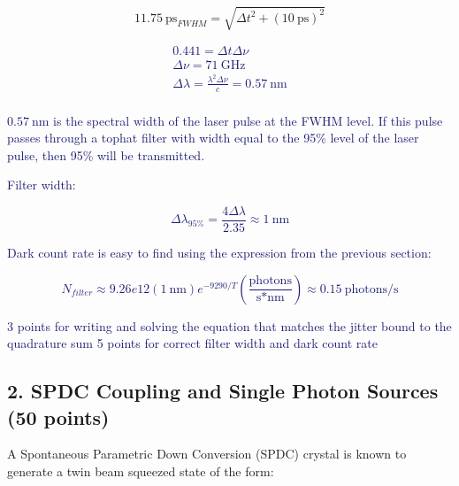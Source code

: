 \documentclass[11pt]{caltech_thesis} %
\begin{document}
\begin{enumerate}
{  $$ 11.75~\text{ps}_{FWHM} = \sqrt{ \Delta t^2 + (10~\text{ps})^2}$$

  }

  \textcolor{midnightblue}{

  $$\begin{aligned}
   0.441 = \Delta t \Delta \nu \\
   \Delta \nu = 71~\text{GHz} \\
   \Delta \lambda = \frac{\lambda^2 \Delta \nu}{c} = 0.57~\text{nm} \\
   \end{aligned}$$

  }

  \textcolor{midnightblue}{ $0.57~\text{nm}$ is the spectral width of
  the laser pulse at the FWHM level. If this pulse passes through a
  tophat filter with width equal to the 95\% level of the laser pulse,
  then 95\% will be transmitted. }

  \textcolor{midnightblue}{Filter width: }

  \textcolor{midnightblue}{

  $$\Delta \lambda_{95\%} = \frac{4 \Delta \lambda}{2.35} \approx \boxed{1~\text{nm}} $$

  }

  \textcolor{midnightblue}{Dark count rate is easy to find using the
  expression from the previous section: }

  \textcolor{midnightblue}{

  $$\boxed{N_{filter} \approx 9.26e12 (1~\text{nm}) e^{-9290/T} (\frac{\text{photons}}{\text{s*nm}})} \approx 0.15~\text{photons/s} $$

  }

  \textcolor{midnightblue}{3 points for writing and solving the equation
  that matches the jitter bound to the quadrature sum }
  \textcolor{midnightblue}{5 points for correct filter width and dark
  count rate}
\end{enumerate}

\hypertarget{spdc-coupling-and-single-photon-sources-50-points}{%
\subsection{2. SPDC Coupling and Single Photon Sources (50
points)}\label{spdc-coupling-and-single-photon-sources-50-points}}

A Spontaneous Parametric Down Conversion (SPDC) crystal is known to
generate a twin beam squeezed state of the form:
\end{document}
